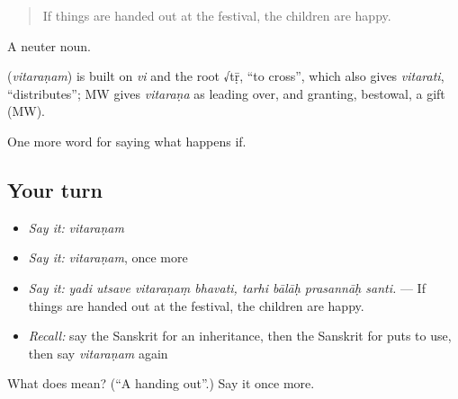 \begin{quote}
If things are handed out at the festival, the children are happy.
\end{quote}

A neuter noun.

\begin{cousinweb}
\textbf{} (\emph{vitaraṇam}) is built on \emph{vi} and the root √tṝ, \textquotedblleft{}to cross\textquotedblright{}, which also gives \emph{vitarati}, \textquotedblleft{}distributes\textquotedblright{}; MW gives \emph{vitaraṇa} as leading over, and granting, bestowal, a gift (MW).
\end{cousinweb}

\begin{grammarlens}[title={What you've built}]
One more word for saying what happens if.
\end{grammarlens}

\subsection*{Your turn}
\begin{itemize}
\raggedright
  \item \emph{Say it:} \emph{vitaraṇam}
  \item \emph{Say it:} \emph{vitaraṇam}, once more
  \item \emph{Say it:} \emph{yadi utsave vitaraṇaṃ bhavati, tarhi bālāḥ prasannāḥ santi.} — If things are handed out at the festival, the children are happy.
  \item \emph{Recall:} say the Sanskrit for an inheritance, then the Sanskrit for puts to use, then say \emph{vitaraṇam} again
\end{itemize}

\begin{tcolorbox}[breakable,colback=teal!4,colframe=teal!35!black,title={Before you move on}]
What does  mean? (\textquotedblleft{}A handing out\textquotedblright{}.) Say it once more.
\end{tcolorbox}
